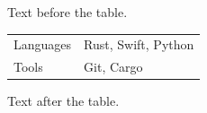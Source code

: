 \documentclass[12pt]{article}
\begin{document}
Text before the table.

\begin{tabular*}{\textwidth}{@{\extracolsep{\fill}}ll}Languages & Rust, Swift, Python\\Tools & Git, Cargo\end{tabular*}

Text after the table.
\end{document}
